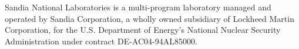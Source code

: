 Sandia National Laboratories is a multi-program laboratory managed and operated by 
Sandia Corporation, a wholly owned subsidiary of Lockheed Martin Corporation, for
the U.S. Department of Energy’s National Nuclear Security Administration under 
contract DE-AC04-94AL85000.

